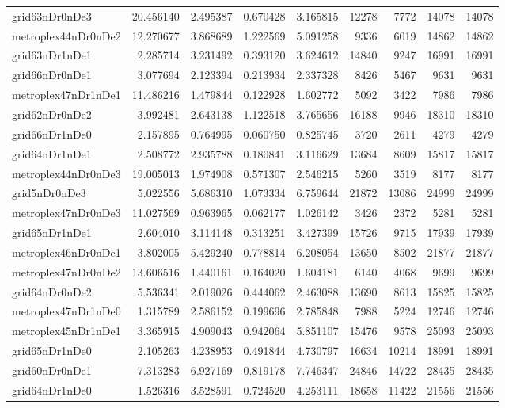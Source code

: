 \begin{longtable}{|l|r|r|r|r|r|r|r|r|}
grid63nDr0nDe3 & 20.456140 & 2.495387 & 0.670428 & 3.165815 & 12278 & 7772 & 14078 & 14078 \\
metroplex44nDr0nDe2 & 12.270677 & 3.868689 & 1.222569 & 5.091258 & 9336 & 6019 & 14862 & 14862 \\
grid63nDr1nDe1 & 2.285714 & 3.231492 & 0.393120 & 3.624612 & 14840 & 9247 & 16991 & 16991 \\
grid66nDr0nDe1 & 3.077694 & 2.123394 & 0.213934 & 2.337328 & 8426 & 5467 & 9631 & 9631 \\
metroplex47nDr1nDe1 & 11.486216 & 1.479844 & 0.122928 & 1.602772 & 5092 & 3422 & 7986 & 7986 \\
grid62nDr0nDe2 & 3.992481 & 2.643138 & 1.122518 & 3.765656 & 16188 & 9946 & 18310 & 18310 \\
grid66nDr1nDe0 & 2.157895 & 0.764995 & 0.060750 & 0.825745 & 3720 & 2611 & 4279 & 4279 \\
grid64nDr1nDe1 & 2.508772 & 2.935788 & 0.180841 & 3.116629 & 13684 & 8609 & 15817 & 15817 \\
metroplex44nDr0nDe3 & 19.005013 & 1.974908 & 0.571307 & 2.546215 & 5260 & 3519 & 8177 & 8177 \\
grid5nDr0nDe3 & 5.022556 & 5.686310 & 1.073334 & 6.759644 & 21872 & 13086 & 24999 & 24999 \\
metroplex47nDr0nDe3 & 11.027569 & 0.963965 & 0.062177 & 1.026142 & 3426 & 2372 & 5281 & 5281 \\
grid65nDr1nDe1 & 2.604010 & 3.114148 & 0.313251 & 3.427399 & 15726 & 9715 & 17939 & 17939 \\
metroplex46nDr0nDe1 & 3.802005 & 5.429240 & 0.778814 & 6.208054 & 13650 & 8502 & 21877 & 21877 \\
metroplex47nDr0nDe2 & 13.606516 & 1.440161 & 0.164020 & 1.604181 & 6140 & 4068 & 9699 & 9699 \\
grid64nDr0nDe2 & 5.536341 & 2.019026 & 0.444062 & 2.463088 & 13690 & 8613 & 15825 & 15825 \\
metroplex47nDr1nDe0 & 1.315789 & 2.586152 & 0.199696 & 2.785848 & 7988 & 5224 & 12746 & 12746 \\
metroplex45nDr1nDe1 & 3.365915 & 4.909043 & 0.942064 & 5.851107 & 15476 & 9578 & 25093 & 25093 \\
grid65nDr1nDe0 & 2.105263 & 4.238953 & 0.491844 & 4.730797 & 16634 & 10214 & 18991 & 18991 \\
grid60nDr0nDe1 & 7.313283 & 6.927169 & 0.819178 & 7.746347 & 24846 & 14722 & 28435 & 28435 \\
grid64nDr1nDe0 & 1.526316 & 3.528591 & 0.724520 & 4.253111 & 18658 & 11422 & 21556 & 21556 \\

\end{longtable}
